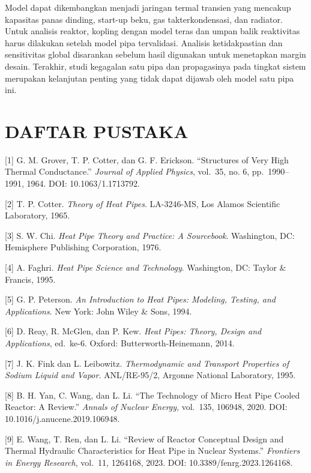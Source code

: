 \documentclass[
  12pt,a4paper,oneside]{report}
\begin{document}
Model dapat dikembangkan menjadi jaringan termal transien yang mencakup
kapasitas panas dinding, start-up beku, gas takterkondensasi, dan
radiator. Untuk analisis reaktor, kopling dengan model teras dan umpan
balik reaktivitas harus dilakukan setelah model pipa tervalidasi.
Analisis ketidakpastian dan sensitivitas global disarankan sebelum hasil
digunakan untuk menetapkan margin desain. Terakhir, studi kegagalan satu
pipa dan propagasinya pada tingkat sistem merupakan kelanjutan penting
yang tidak dapat dijawab oleh model satu pipa ini.

\hypertarget{daftar-pustaka}{%
\chapter*{DAFTAR PUSTAKA}\label{daftar-pustaka}}

{[}1{]} G. M. Grover, T. P. Cotter, dan G. F. Erickson. ``Structures of
Very High Thermal Conductance.'' \emph{Journal of Applied Physics},
vol.~35, no. 6, pp.~1990--1991, 1964. DOI: 10.1063/1.1713792.

{[}2{]} T. P. Cotter. \emph{Theory of Heat Pipes}. LA-3246-MS, Los
Alamos Scientific Laboratory, 1965.

{[}3{]} S. W. Chi. \emph{Heat Pipe Theory and Practice: A Sourcebook}.
Washington, DC: Hemisphere Publishing Corporation, 1976.

{[}4{]} A. Faghri. \emph{Heat Pipe Science and Technology}. Washington,
DC: Taylor \& Francis, 1995.

{[}5{]} G. P. Peterson. \emph{An Introduction to Heat Pipes: Modeling,
Testing, and Applications}. New York: John Wiley \& Sons, 1994.

{[}6{]} D. Reay, R. McGlen, dan P. Kew. \emph{Heat Pipes: Theory, Design
and Applications}, ed.~ke-6. Oxford: Butterworth-Heinemann, 2014.

{[}7{]} J. K. Fink dan L. Leibowitz. \emph{Thermodynamic and Transport
Properties of Sodium Liquid and Vapor}. ANL/RE-95/2, Argonne National
Laboratory, 1995.

{[}8{]} B. H. Yan, C. Wang, dan L. Li. ``The Technology of Micro Heat
Pipe Cooled Reactor: A Review.'' \emph{Annals of Nuclear Energy},
vol.~135, 106948, 2020. DOI: 10.1016/j.anucene.2019.106948.

{[}9{]} E. Wang, T. Ren, dan L. Li. ``Review of Reactor Conceptual
Design and Thermal Hydraulic Characteristics for Heat Pipe in Nuclear
Systems.'' \emph{Frontiers in Energy Research}, vol.~11, 1264168, 2023.
DOI: 10.3389/fenrg.2023.1264168.
\end{document}
